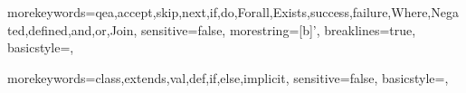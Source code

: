 
\usepackage{amsmath,amssymb}

\usepackage{graphicx}
\usepackage{pgfplots}
\usepackage{graphics}
\usepackage{placeins}

\newcommand{\event}[1]{\ensuremath{\mathtt{#1}}}
\newcommand{\code}[1]{\texttt{#1}}

\newcommand{\ignore}[2]{
{
\vspace{0.5cm}
\noindent\color{red} *** IGNORING: '#1' discussion. See source.}
\vspace{0.5cm}
}

\newcommand{\GR}[1]{\notethis{ForestGreen}{Giles}{#1}}
\newcommand{\GRinline}[1]{{\color{ForestGreen}{#1}}}
\newcommand{\KH}[1]{\notethis{blue}{Klaus}{#1}}
\newcommand{\KHinline}[1]{{\color{blue}{#1}}}

\newcommand{\notethis}[3]{
  \color{#1}
  \vspace{0.3cm}
  \noindent\makebox[\linewidth]{\rule{\paperwidth}{0.4pt}}\\
  {\sc #2 - } #3\\
  \noindent\makebox[\linewidth]{\rule{\paperwidth}{0.4pt}}\\
  \vspace{0.3cm}
  \color{black}
}
\newcommand{\todo}[1]{{\color{red}{#1}}}

\newcommand{\red}[1]{{\color{red} #1}}
\newcommand{\green}[1]{{\color{green} #1}}
\newcommand{\blue}[1]{{\color{blue} #1}}
\newcommand{\orange}[1]{{\color{orange} #1}}

\usepackage{listings}

{morekeywords={qea,accept,skip,next,if,do,Forall,Exists,success,failure,Where,Negated,defined,and,or,Join},
sensitive=false,
morestring=[b]',
breaklines=true,
basicstyle=\ttfamily\scriptsize,
}

 {
  morekeywords={class,extends,val,def,if,else,implicit},
  sensitive=false,
  basicstyle=\ttfamily\scriptsize,
}


\newcommand{\oldtheme}[1]{\emph{#1}}

\newcommand{\THsafetyliveness}{\theme{Safety versu Liveness}}
\newcommand{\THnames}{\theme{Statemachines}}
\newcommand{\THreachability}{\theme{Reachability}}
\newcommand{\THnonregularity}{\theme{Non-regularity}}
\newcommand{\THsequences}{\theme{Sequences}}
\newcommand{\THtemporallogic}{\theme{Temporal Logic}}
\newcommand{\THconvenient}{\theme{Convenient operators}}
\newcommand{\THquantification}{\theme{Quantification}}
\newcommand{\THtiming}{\theme{Time}}
\newcommand{\THcoding}{\theme{Coding}}
\newcommand{\THmatching}{\theme{Matching}}
\newcommand{\THembedding}{\theme{Embedding}}
\newcommand{\THscope}{\theme{Scope}}
\newcommand{\THalphabet}{\theme{Alphabet}}
\newcommand{\THmodularity}{\theme{Modularity}}


